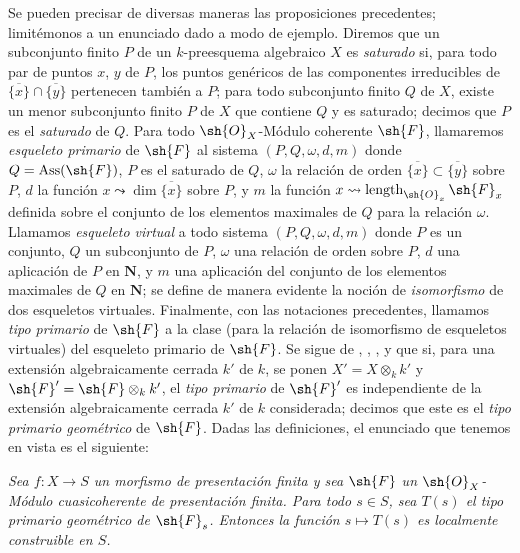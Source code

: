 \begin{remark}[9.8.9]
\label{IV.9.8.9}
Se pueden precisar de diversas maneras las proposiciones precedentes; limitémonos a un enunciado dado a modo de ejemplo.
Diremos que un subconjunto finito $P$ de un $k$-preesquema algebraico $X$ es \emph{saturado} si, para todo par de puntos $x$, $y$ de $P$, los puntos genéricos de las componentes irreducibles de $\overline{\{x\}}\cap\overline{\{y\}}$ pertenecen también a $P$; para todo subconjunto finito $Q$ de $X$, existe un menor subconjunto finito $P$ de $X$ que contiene $Q$ y es saturado; decimos que $P$ es el \emph{saturado} de $Q$.
Para todo $\sh{O}_X$-Módulo coherente $\sh{F}$, llamaremos \emph{esqueleto primario} de $\sh{F}$ al sistema $(P,Q,\omega,d,m)$ donde $Q=\operatorname{Ass}(\sh{F})$, $P$ es el saturado de $Q$, $\omega$ la relación de orden $\overline{\{x\}}\subset\overline{\{y\}}$ sobre $P$, $d$ la función $x\leadsto\dim\overline{\{x\}}$ sobre $P$, y $m$ la función $x\leadsto\operatorname{length}_{\sh{O}_x}\sh{F}_x$ definida sobre el conjunto de los elementos maximales de $Q$ para la relación $\omega$.
Llamamos \emph{esqueleto virtual} a todo sistema $(P,Q,\omega,d,m)$ donde $P$ es un conjunto, $Q$ un subconjunto de $P$, $\omega$ una relación de orden sobre $P$, $d$ una aplicación de $P$ en $\mathbf{N}$, y $m$ una aplicación del conjunto de los elementos maximales de $Q$ en $\mathbf{N}$; se define de manera evidente la noción de \emph{isomorfismo} de dos esqueletos virtuales.
Finalmente, con las notaciones precedentes, llamamos \emph{tipo primario} de $\sh{F}$ a la clase (para la relación de isomorfismo de esqueletos virtuales) del esqueleto primario de $\sh{F}$.
Se sigue de , , ,  y  que si, para una extensión algebraicamente cerrada $k'$ de $k$, se ponen $X'=X\otimes_k k'$ y $\sh{F}'=\sh{F}\otimes_k k'$, el \emph{tipo primario} de $\sh{F}'$ es independiente de la
extensión algebraicamente cerrada $k'$ de $k$ considerada; decimos que este es el \emph{tipo primario geométrico} de $\sh{F}$.
Dadas las definiciones, el enunciado que tenemos en vista es el siguiente:

\medskip
\noindent
\emph{}
\label{IV.9.8.9.1}
\textit{Sea $f:X\to S$ un morfismo de presentación finita y sea $\sh{F}$ un $\sh{O}_X$-Módulo cuasicoherente de presentación finita.
Para todo $s\in S$, sea $T(s)$ el tipo primario geométrico de $\sh{F}_s$.
Entonces la función $s\mapsto T(s)$ es localmente construible en $S$.}


\end{remark}

